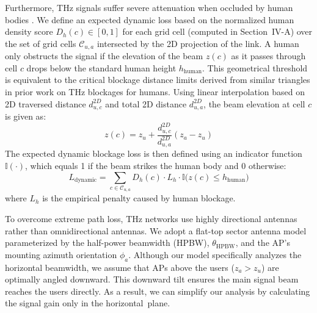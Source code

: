\documentclass[conference]{IEEEtran}
\begin{document}
Furthermore, THz signals suffer severe attenuation when occluded by human bodies \cite{b3}. We define an expected dynamic loss based on the normalized human density score $D_h(c) \in [0,1]$ for each grid cell (computed in Section~IV-A) over the set of grid cells $\mathcal{C}_{u,a}$ intersected by the 2D projection of the link.  A human only obstructs the signal if the elevation of the beam $z(c)$ as it passes through cell $c$ drops below 
the standard human height $h_{\text{human}}$.  
This geometrical threshold is equivalent to the critical blockage distance limits derived from similar triangles in prior work on THz blockages for humans. Using linear interpolation based on 2D traversed distance $d_{u,c}^{2D}$ and total 2D distance $d_{u,a}^{2D}$, the beam elevation at cell $c$ is given as:
\begin{equation}
    z(c) = z_u + \frac{d_{u,c}^{2D}}{d_{u,a}^{2D}} (z_a - z_u)
\end{equation}
The expected dynamic blockage loss is then defined using an indicator function $\mathbb{I}(\cdot)$, which equals 1 if the beam strikes the human body and 0 otherwise:
\begin{equation}
    L_{\text{dynamic}} = \sum_{c \in \mathcal{C}_{u,a}} D_h(c) \cdot L_{h} \cdot \mathbb{I}\Big(z(c) \le h_{\text{human}}\Big)
    \label{eq:dynamic_loss}
\end{equation}
where $L_{h}$ is the empirical penalty caused by human blockage.

To overcome extreme path loss, THz networks use highly directional antennas rather than omnidirectional antennas. We adopt a flat-top sector antenna model parameterized by the half-power beamwidth (HPBW), $\theta_{\text{HPBW}}$, and the AP's mounting azimuth orientation $\phi_a$. Although our model specifically analyzes the horizontal beamwidth, we assume that APs above the users ($z_a > z_u$) are optimally angled downward. This downward tilt ensures the main signal beam reaches the users directly. As a result, we can simplify our analysis by calculating the signal gain only in the horizontal~plane. 
\end{document}
